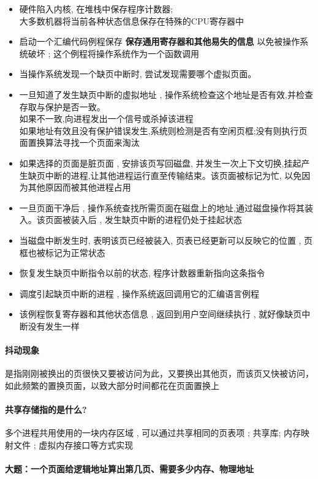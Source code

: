 \documentclass[UTF8,a4paper]{ctexart}
\begin{document}
\begin{itemize}
	\item 硬件陷入内核, 在堆栈中保存程序计数器;\\
	大多数机器将当前各种状态信息保存在特殊的CPU寄存器中
	\item 启动一个汇编代码例程保存 \textbf{保存通用寄存器和其他易失的信息} 以免被操作系统破坏 ; 这个例程将操作系统作为一个函数调用
	\item 当操作系统发现一个缺页中断时, 尝试发现需要哪个虚拟页面。
	\item 一旦知道了发生缺页中断的虚拟地址 , 操作系统检查这个地址是否有效,并检查存取与保护是否一致。\\
	如果不一致,向进程发出一个信号或杀掉该进程\\
	如果地址有效且没有保护错误发生,系统则检测是否有空闲页框;没有则执行页面置换算法寻找一个页面来淘汰
	\item 如果选择的页面是脏页面 , 安排该页写回磁盘, 并发生一次上下文切换,挂起产生缺页中断的进程,让其他进程运行直至传输结束。该页面被标记为忙, 以免因为其他原因而被其他进程占用
	\item 一旦页面干净后 , 操作系统查找所需页面在磁盘上的地址,通过磁盘操作将其装入。该页面被装入后 , 发生缺页中断的进程仍处于挂起状态
	\item 当磁盘中断发生时, 表明该页已经被装入, 页表已经更新可以反映它的位置 , 页框也被标记为正常状态
	\item 恢复发生缺页中断指令以前的状态, 程序计数器重新指向这条指令
	\item 调度引起缺页中断的进程 , 操作系统返回调用它的汇编语言例程
	\item 该例程恢复寄存器和其他状态信息 , 返回到用户空间继续执行 , 就好像缺页中断没有发生一样
\end{itemize}

\paragraph{抖动现象}是指刚刚被换出的页很快又要被访问为此，又要换出其他页，而该页又快被访问，如此频繁的置换页面，以致大部分时间都花在页面置换上

\paragraph{共享存储指的是什么?}
多个进程共用使用的一块内存区域 , 可以通过共享相同的页表项 ; 共享库; 内存映射文件 ; 虚拟内存接口等方式实现

\paragraph{大题：一个页面给逻辑地址算出第几页、需要多少内存、物理地址}
\end{document}
